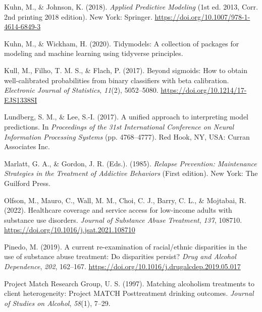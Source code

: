 \documentclass[
]{agujournal2019}
\newlength{\cslhangindent}
\newenvironment{CSLReferences}[2] %
 {\begin{list}{}{%
  \setlength{\itemindent}{0pt}
  \setlength{\leftmargin}{0pt}
  \setlength{\parsep}{0pt}
  \ifodd #1
   \setlength{\leftmargin}{\cslhangindent}
   \setlength{\itemindent}{-1\cslhangindent}
  \fi
  \setlength{\itemsep}{#2\baselineskip}}}
 {\end{list}}
\begin{document}
\begin{CSLReferences}{1}{0}
Kuhn, M., \& Johnson, K. (2018). \emph{Applied {Predictive Modeling}}
(1st ed. 2013, Corr. 2nd printing 2018 edition). New York: Springer.
\url{https://doi.org/10.1007/978-1-4614-6849-3}

Kuhn, M., \& Wickham, H. (2020). Tidymodels: A collection of packages
for modeling and machine learning using tidyverse principles.

Kull, M., Filho, T. M. S., \& Flach, P. (2017). Beyond sigmoids: {How}
to obtain well-calibrated probabilities from binary classifiers with
beta calibration. \emph{Electronic Journal of Statistics}, \emph{11}(2),
5052--5080. \url{https://doi.org/10.1214/17-EJS1338SI}

Lundberg, S. M., \& Lee, S.-I. (2017). A unified approach to
interpreting model predictions. In \emph{Proceedings of the 31st
{International Conference} on {Neural Information Processing Systems}}
(pp. 4768--4777). Red Hook, NY, USA: Curran Associates Inc.

Marlatt, G. A., \& Gordon, J. R. (Eds.). (1985). \emph{Relapse
{Prevention}: {Maintenance Strategies} in the {Treatment} of {Addictive
Behaviors}} (First edition). New York: The Guilford Press.

Olfson, M., Mauro, C., Wall, M. M., Choi, C. J., Barry, C. L., \&
Mojtabai, R. (2022). Healthcare coverage and service access for
low-income adults with substance use disorders. \emph{Journal of
Substance Abuse Treatment}, \emph{137}, 108710.
\url{https://doi.org/10.1016/j.jsat.2021.108710}

Pinedo, M. (2019). A current re-examination of racial/ethnic disparities
in the use of substance abuse treatment: {Do} disparities persist?
\emph{Drug and Alcohol Dependence}, \emph{202}, 162--167.
\url{https://doi.org/10.1016/j.drugalcdep.2019.05.017}

Project Match Research Group, U. S. (1997). Matching alcoholism
treatments to client heterogeneity: {Project MATCH Posttreatment}
drinking outcomes. \emph{Journal of Studies on Alcohol}, \emph{58}(1),
7--29.


\end{CSLReferences}
\end{document}
